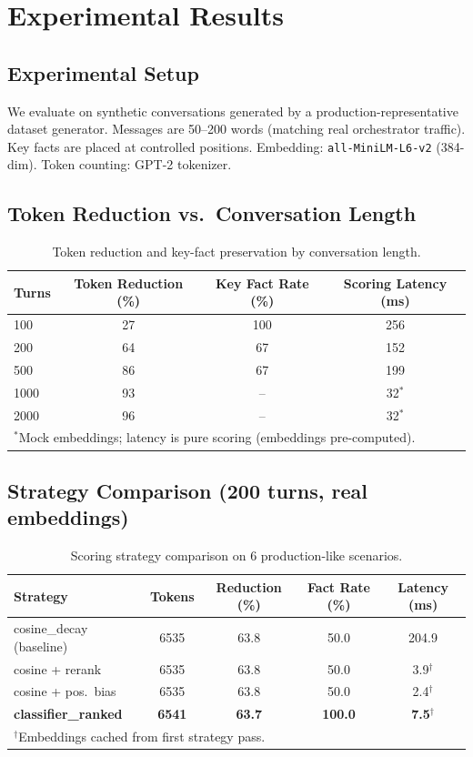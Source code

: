 \documentclass[11pt,a4paper]{article}
\begin{document}
\section{Experimental Results}
\label{sec:results}

\subsection{Experimental Setup}

We evaluate on synthetic conversations generated by a production-representative
dataset generator. Messages are 50--200 words (matching real orchestrator traffic).
Key facts are placed at controlled positions. Embedding: \texttt{all-MiniLM-L6-v2}
(384-dim). Token counting: GPT-2 tokenizer.

\subsection{Token Reduction vs.\ Conversation Length}

\begin{table}[H]
\centering
\caption{Token reduction and key-fact preservation by conversation length.}
\label{tab:scale}
\begin{tabular}{lccc}
\toprule
Turns & Token Reduction (\%) & Key Fact Rate (\%) & Scoring Latency (ms) \\
\midrule
100 & 27 & 100 & 256 \\
200 & 64 & 67 & 152 \\
500 & 86 & 67 & 199 \\
1000 & 93 & -- & 32$^*$ \\
2000 & 96 & -- & 32$^*$ \\
\bottomrule
\multicolumn{4}{l}{\footnotesize $^*$Mock embeddings; latency is pure scoring (embeddings pre-computed).}
\end{tabular}
\end{table}

\subsection{Strategy Comparison (200 turns, real embeddings)}

\begin{table}[H]
\centering
\caption{Scoring strategy comparison on 6 production-like scenarios.}
\label{tab:strategies}
\begin{tabular}{lcccc}
\toprule
Strategy & Tokens & Reduction (\%) & Fact Rate (\%) & Latency (ms) \\
\midrule
cosine\_decay (baseline) & 6535 & 63.8 & 50.0 & 204.9 \\
cosine + rerank & 6535 & 63.8 & 50.0 & 3.9$^\dagger$ \\
cosine + pos.\ bias & 6535 & 63.8 & 50.0 & 2.4$^\dagger$ \\
\textbf{classifier\_ranked} & \textbf{6541} & \textbf{63.7} & \textbf{100.0} & \textbf{7.5}$^\dagger$ \\
\bottomrule
\multicolumn{5}{l}{\footnotesize $^\dagger$Embeddings cached from first strategy pass.}
\end{tabular}
\end{table}
\end{document}

